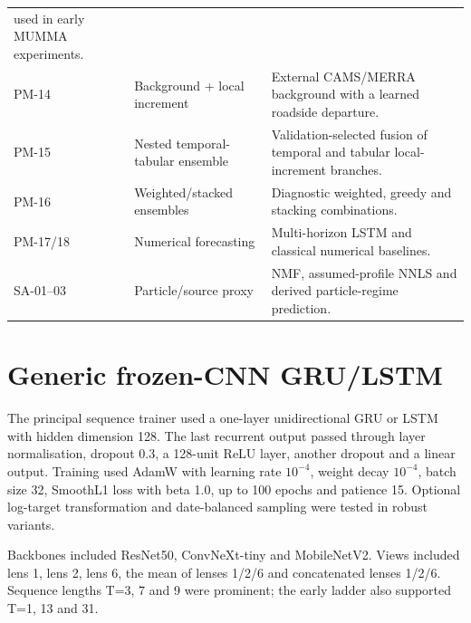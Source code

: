 \documentclass[11pt,a4paper,oneside]{report}
\begin{document}
\begin{longtable}{p{}p{}p{}}
  used in early MUMMA experiments.\\
  PM-14 & Background + local increment & External CAMS/MERRA background with a
  learned roadside departure.\\
  PM-15 & Nested temporal-tabular ensemble & Validation-selected fusion of
  temporal and tabular local-increment branches.\\
  PM-16 & Weighted/stacked ensembles & Diagnostic weighted, greedy and stacking
  combinations.\\
  PM-17/18 & Numerical forecasting & Multi-horizon LSTM and classical numerical
  baselines.\\
  SA-01--03 & Particle/source proxy & NMF, assumed-profile NNLS and derived
  particle-regime prediction.\\
  \bottomrule
\end{longtable}

\section{Generic frozen-CNN GRU/LSTM}
The principal sequence trainer used a one-layer unidirectional GRU or LSTM with
hidden dimension 128. The last recurrent output passed through layer
normalisation, dropout 0.3, a 128-unit ReLU layer, another dropout and a linear
output. Training used AdamW with learning rate $10^{-4}$, weight decay
$10^{-4}$, batch size 32, SmoothL1 loss with beta 1.0, up to 100 epochs and
patience 15. Optional log-target transformation and date-balanced sampling were
tested in robust variants.

Backbones included ResNet50, ConvNeXt-tiny and MobileNetV2. Views included lens
1, lens 2, lens 6, the mean of lenses 1/2/6 and concatenated lenses 1/2/6.
Sequence lengths T=3, 7 and 9 were prominent; the early ladder also supported
T=1, 13 and 31.
\end{document}
